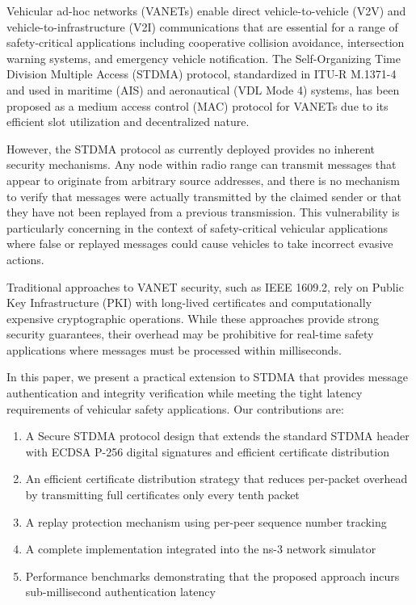 \documentclass[conference]{IEEEtran}
\begin{document}
Vehicular ad-hoc networks (VANETs) enable direct vehicle-to-vehicle (V2V) and vehicle-to-infrastructure (V2I) communications that are essential for a range of safety-critical applications including cooperative collision avoidance, intersection warning systems, and emergency vehicle notification. The Self-Organizing Time Division Multiple Access (STDMA) protocol, standardized in ITU-R M.1371-4 and used in maritime (AIS) and aeronautical (VDL Mode 4) systems, has been proposed as a medium access control (MAC) protocol for VANETs due to its efficient slot utilization and decentralized nature.

However, the STDMA protocol as currently deployed provides no inherent security mechanisms. Any node within radio range can transmit messages that appear to originate from arbitrary source addresses, and there is no mechanism to verify that messages were actually transmitted by the claimed sender or that they have not been replayed from a previous transmission. This vulnerability is particularly concerning in the context of safety-critical vehicular applications where false or replayed messages could cause vehicles to take incorrect evasive actions.

Traditional approaches to VANET security, such as IEEE 1609.2, rely on Public Key Infrastructure (PKI) with long-lived certificates and computationally expensive cryptographic operations. While these approaches provide strong security guarantees, their overhead may be prohibitive for real-time safety applications where messages must be processed within milliseconds.

In this paper, we present a practical extension to STDMA that provides message authentication and integrity verification while meeting the tight latency requirements of vehicular safety applications. Our contributions are:

\begin{enumerate}
    \item A Secure STDMA protocol design that extends the standard STDMA header with ECDSA P-256 digital signatures and efficient certificate distribution
    \item An efficient certificate distribution strategy that reduces per-packet overhead by transmitting full certificates only every tenth packet
    \item A replay protection mechanism using per-peer sequence number tracking
    \item A complete implementation integrated into the ns-3 network simulator
    \item Performance benchmarks demonstrating that the proposed approach incurs sub-millisecond authentication latency
\end{enumerate}
\end{document}

